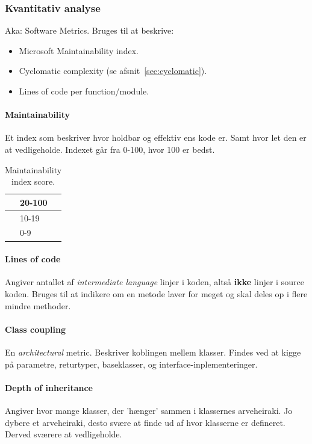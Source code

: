 \subsubsection{Kvantitativ analyse}
Aka: Software Metrics. Bruges til at beskrive: 

\begin{itemize}
	\item Microsoft Maintainability index.
	\item Cyclomatic complexity (se afsnit~\ref{sec:cyclomatic}).
	\item Lines of code per function/module.
\end{itemize}

\paragraph{Maintainability}
Et index som beskriver hvor holdbar og effektiv ens kode er. Samt hvor let den er at vedligeholde. Indexet går fra 0-100, hvor 100 er bedst.

\def\arraystretch{1.5}%
\begin{table}[H]
	\centering
	\begin{tabular}{|c|l|}
		\hline
		\hspace{2cm} \cellcolor{green}& 20-100\\
		\hline
		\cellcolor{yellow}& 10-19\\
		\hline
		\cellcolor{red}& 0-9\\
		\hline
	\end{tabular}
	\caption{Maintainability index score.}
\end{table}

\paragraph{Lines of code}
Angiver antallet af \textit{intermediate language} linjer i koden, altså \textbf{ikke} linjer i source koden. Bruges til at indikere om en metode laver for meget og skal deles op i flere mindre methoder.

\paragraph{Class coupling}
En \textit{architectural} metric. Beskriver koblingen mellem klasser. Findes ved at kigge på parametre, returtyper, baseklasser, og interface-inplementeringer.

\paragraph{Depth of inheritance}
Angiver hvor mange klasser, der 'hænger' sammen i klassernes arveheiraki. Jo dybere et arveheiraki, desto svære at finde ud af hvor klasserne er defineret. Derved sværere at vedligeholde.








